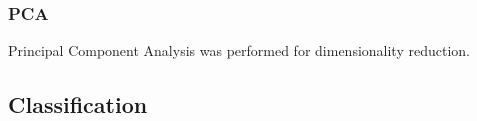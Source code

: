 \documentclass[12pt,a4paper]{article}
\numberwithin{figure}{section}
\numberwithin{table}{section}
\numberwithin{definition}{section}
\begin{document}



\subsubsection{PCA}
\label{ssec:pca}


Principal Component Analysis was performed for dimensionality reduction. 


\subsection{Classification}
\label{ssec:classification}
\end{document}
